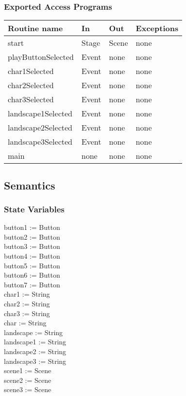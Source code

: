 \documentclass[12pt, titlepage]{article}
\begin{document}
\subsubsection {Exported Access Programs}
\begin{tabular}{| l | l | l | l |}
\hline
\textbf{Routine name} & \textbf{In} & \textbf{Out} & \textbf{Exceptions}\\
\hline
start & Stage & Scene & none\\
\hline
playButtonSelected & Event & none & none\\
\hline
char1Selected & Event & none & none\\
\hline
char2Selected & Event & none & none\\
\hline
char3Selected & Event & none & none\\
\hline
landscape1Selected & Event & none & none\\
\hline
landscape2Selected & Event & none & none\\
\hline
landscape3Selected & Event & none & none\\
\hline
main & none & none & none\\
\hline
\end{tabular}
\subsection {Semantics}
\subsubsection {State Variables}
button1 := Button\\
button2 := Button\\
button3 := Button\\
button4 := Button\\
button5 := Button\\
button6 := Button\\
button7 := Button\\
char1 := String\\
char2 := String\\
char3 := String\\
char := String\\
landscape := String\\
landscape1 := String\\
landscape2 := String\\
landscape3 := String\\
scene1 := Scene\\
scene2 := Scene\\
scene3 := Scene\\
\end{document}
